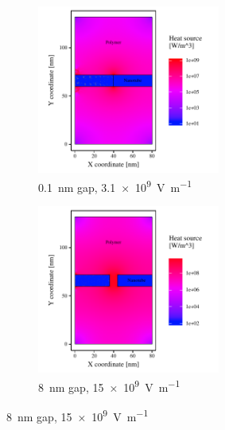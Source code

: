 \documentclass[11pt,review,times]{elsarticle}
\begin{document}
\begin{figure}[htb]
	\centering
	\begin{subfigure}{60mm}
		\centering
		\captionsetup{width=55mm}
		\includegraphics[width=60mm]{resultats_0,1nm_comsol_2D_puissance}
		\caption{\SI{0.1}{\nano\metre} gap, \SI{3.1e9}{\volt\per\metre}}
		\label{fig:result_gap01nm_power}		
	\end{subfigure} 
	\begin{subfigure}{60mm}
		\centering
		\captionsetup{width=55mm}
		\includegraphics[width=60mm]{resultats_8nm_comsol_2D_puissance}
		\caption{\SI{8}{\nano\metre} gap, \SI{15e9}{\volt\per\metre}}
		\label{fig:result_gap8nm_power}		
	\end{subfigure}


\end{figure}
\end{document}
